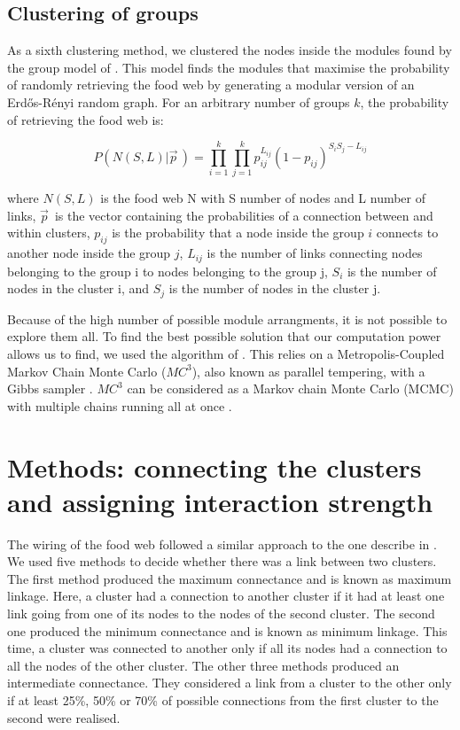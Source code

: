 	\subsection*{Clustering of groups}

		As a sixth clustering method, we clustered the nodes inside the modules found by the group model of \citep{Allesina2009a}. This model finds the modules that maximise the probability of randomly retrieving the food web by generating a modular version of an Erdős-Rényi random graph. For an arbitrary number of groups $k$, the probability of retrieving the food web is:

				\begin{equation}
					P(N(S,L)|\vec{p}^{\,})=\prod_{i=1}^k\prod_{j=1}^k p_{ij}^{L_{ij}} (1-p_{ij})^{S_i S_j - L_{ij}}
				\end{equation}

		\noindent where $N(S,L)$ is the food web N with S number of nodes and L number of links,  $\vec{p}^{\,}$ is the vector containing the probabilities of a connection between and within clusters, $p_{ij}$ is the probability that a node inside the group $i$ connects to another node inside the group $j$, $L_{ij}$ is the number of links connecting nodes belonging to the group i to nodes belonging to the group j, $S_i$ is the number of nodes in the cluster i,  and $S_j$ is the number of nodes in the cluster j.

		Because of the high number of possible module arrangments, it is not possible to explore them all. To find the best possible solution that our computation power allows us to find, we used the algorithm of \citet{Sander2015}. This relies on a Metropolis-Coupled Markov Chain Monte Carlo ($MC^3$), also known as parallel tempering\citep{Geyer1991}, with a Gibbs sampler \citep{Yildirim2012}. $MC^3$ can be considered as a Markov chain Monte Carlo (MCMC) with multiple chains running all at once \citep{Sander2015}.

\section*{Methods: connecting the clusters and assigning interaction strength}

	The wiring of the food web followed a similar approach to the one describe in \citet{Martinez1991}. We used five methods to decide whether there was a link between two clusters. The first method produced the maximum connectance and is known as maximum linkage. Here, a cluster had a connection to another cluster if it had at least one link going from one of its nodes to the nodes of the second cluster. The second one produced the minimum connectance and is known as minimum linkage. This time, a cluster was connected to another only if all its nodes had a connection to all the nodes of the other cluster. The other three methods produced an intermediate connectance. They considered a link from a cluster to the other only if at least 25\%, 50\% or 70\% of possible connections from the first cluster to the second were realised.

